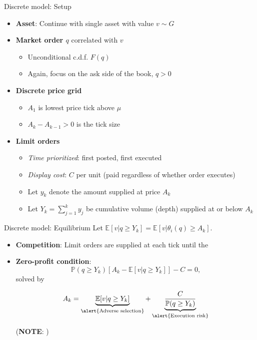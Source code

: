 \documentclass[english,10pt
,aspectratio=169
]{beamer}
\begin{document}
\begin{frame}{Discrete model: Setup}
	\begin{itemize}
		\item \textbf{Asset}: Continue with single asset with value $v \sim G$
		\item \textbf{Market order $q$} correlated with $v$
		\begin{itemize}
			\item Unconditional c.d.f. $F(q)$
			\item Again, focus on the ask side of the book, $q>0$
		\end{itemize}
		\item \textbf{Discrete price grid}
		\begin{itemize}
			\item $A_1$ is lowest price tick above $\mu$
			\item $A_k-A_{k-1}>0$ is the tick size
		\end{itemize}
		\item \textbf{Limit orders}
		\begin{itemize}
			\item \textit{Time prioritized}: first posted, first executed
			\item \textit{Display cost}: $C$ per unit (paid regardless of whether order executes)
			\item Let $y_k$ denote the amount supplied at price $A_k$
			\item Let $Y_k=\sum_{j=1}^k y_j$ be cumulative volume (depth) supplied at or below $A_k$
		\end{itemize}
	\end{itemize}
\end{frame}


\begin{frame}{Discrete model: Equilibrium}
	Let $\mathbb{E}[v|q \geq Y_k]=\mathbb{E}[v|\theta_i(q) \geq A_k]$.
	\begin{itemize}
		\item \textbf{Competition}: Limit orders are supplied at each tick until the 
		\item \textbf{Zero-profit condition}:
		\[
		\mathbb{P}(q \geq Y_k)[A_k-\mathbb{E}[v|q \geq Y_k]] - C = 0,
		\]
		solved by
		\begin{block}{}
			\[
			A_k = \underbrace{\mathbb{E}[v| q \geq Y_k]}_{\text{\alert{Adverse selection}}} + \underbrace{\frac{C}{\mathbb{P}(q\geq Y_k)}}_{\text{\alert{Execution risk}}}
			\]
		\end{block}
		(\textbf{NOTE}: )
	\end{itemize}
\end{frame}
\end{document}
